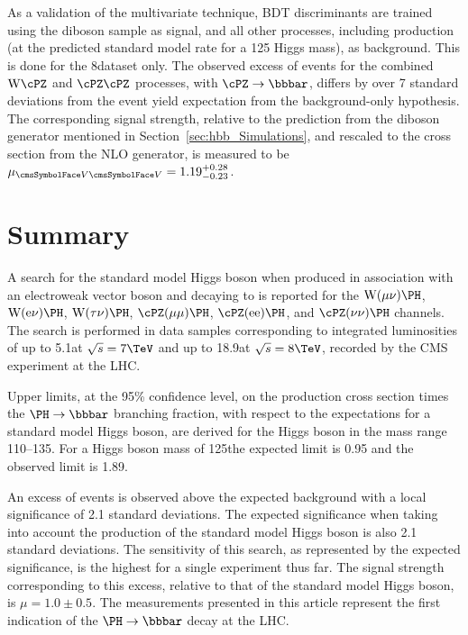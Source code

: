 \documentclass[12pt,twoside,a4paper,cmspaper,final,collab]{cms-tdr}
\begin{document}
As a validation of the multivariate technique, BDT discriminants are trained
using the diboson sample as signal, and all other processes, including
\VH production (at the predicted standard model rate for a 125\GeV
Higgs mass), as background. This is done for the 8\TeV dataset only.
The observed excess of events for the combined $\PW\cPZ$ and $\cPZ\cPZ$ processes, with
$\cPZ\to\bbbar$, differs by over 7 standard deviations from the event yield expectation
from the background-only hypothesis. The corresponding signal
strength, relative to
the prediction from the diboson {\MADGRAPH} generator mentioned in
Section~\ref{sec:hbb_Simulations},
and rescaled to the cross section from the NLO {\MCFM} generator,
is measured to be  $\mu_{\Vvar\Vvar} = {1.19}_{-0.23}^{+0.28}$.


\section{Summary}\label{sec:hbb_Conclusions}


 A search for the standard model Higgs boson when produced in association with an electroweak
   vector boson and decaying to
\bbbar is reported for the $\PW(\mu\nu)\PH$,
   $\PW(\Pe\nu)\PH$,
$\PW(\tau\nu)\PH$, $\cPZ(\mu\mu)\PH$, $\cPZ(\Pe\Pe)\PH$, and
   $\cPZ(\nu\nu)\PH$ channels. The search is performed in data samples corresponding to integrated
luminosities of up to 5.1\fbinv at $\sqrt{s}=7\TeV$ and up to
18.9\fbinv at $\sqrt{s}=8\TeV$, recorded by the CMS experiment
at the LHC.


Upper limits, at the 95\% confidence level, on the
   \VH production cross section times the $\PH \to \bbbar$
   branching fraction, with respect to the expectations for a standard
   model Higgs boson, are derived for the Higgs boson in the mass range
   110--135\GeV. For a Higgs
   boson mass of 125\GeV the expected limit is 0.95 and the observed
   limit is 1.89.

An excess of events is observed above the expected
   background with a local significance of 2.1 standard deviations. The
   expected significance when taking into account the production of the
   standard model Higgs boson is also 2.1 standard deviations. The sensitivity of this
   search, as represented by the expected significance, is the highest
   for a single experiment thus far.  The signal strength corresponding to this excess, relative to that of
   the standard model Higgs boson, is  $\mu = 1.0\pm 0.5$. The
   measurements presented in this article represent the first indication
   of the $\PH \to \bbbar$ decay at the LHC.
\end{document}
